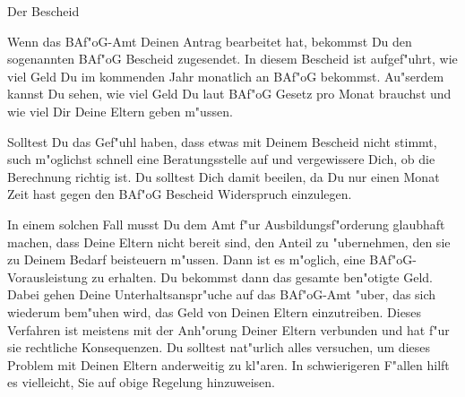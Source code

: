 \begin{artikel}{Der Bescheid}

Wenn das BAf"oG-Amt Deinen Antrag bearbeitet hat, bekommst Du den sogenannten BAf"oG Bescheid zugesendet. In diesem Bescheid ist aufgef"uhrt, wie viel Geld Du im kommenden Jahr monatlich an BAf"oG bekommst. Au"serdem kannst Du sehen, wie viel Geld Du laut BAf"oG Gesetz pro Monat brauchst und wie viel Dir Deine Eltern geben m"ussen.

Solltest Du das Gef"uhl haben, dass etwas mit Deinem Bescheid nicht stimmt, such m"oglichst schnell eine Beratungsstelle auf und vergewissere Dich, ob die Berechnung richtig ist. Du solltest Dich damit beeilen, da Du nur einen Monat Zeit hast gegen den BAf"oG Bescheid Widerspruch einzulegen.

In einem solchen Fall musst Du dem Amt f"ur Ausbildungsf"orderung glaubhaft machen, dass Deine Eltern nicht bereit sind, den Anteil zu "ubernehmen, den sie zu Deinem Bedarf beisteuern m"ussen. Dann ist es m"oglich, eine BAf"oG-Vorausleistung zu erhalten. Du bekommst dann das gesamte ben"otigte Geld. Dabei gehen Deine Unterhaltsanspr"uche auf das BAf"oG-Amt "uber, das sich wiederum bem"uhen wird, das Geld von Deinen Eltern einzutreiben. Dieses Verfahren ist meistens mit der Anh"orung Deiner Eltern verbunden und hat f"ur sie rechtliche Konsequenzen. Du solltest nat"urlich alles versuchen, um dieses Problem mit Deinen Eltern anderweitig zu kl"aren. In schwierigeren F"allen hilft es vielleicht, Sie auf obige Regelung hinzuweisen.
\end{artikel}

